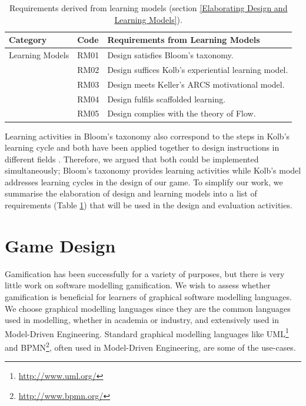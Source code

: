 \documentclass[12pt, a4paper]{report}
\begin{document}
\begin{table}[ht]
\caption{Requirements derived from learning models (section \ref{Elaborating Design and Learning Models}).}
\label{design-learning-models}
\begin{center}
\begin{tabular}{ p{2cm}p{1cm}p{10cm} } 
\hline
Category & Code & Requirements from Learning Models \\
\hline
\multirow{1}{2cm}{Learning Models} 
& RM01 & Design satisfies Bloom's taxonomy. \\
& RM02 & Design suffices Kolb's experiential learning model. \\ 
& RM03 & Design meets Keller's ARCS motivational model. \\
& RM04 & Design fulfils scaffolded learning. \\
& RM05 & Design complies with the theory of Flow. \\ 
\hline
\end{tabular}
\end{center}
\end{table}

Learning activities in Bloom's taxonomy also correspond to the steps in Kolb's learning cycle \cite{murphy2007prior} and both have been applied together to design instructions in different fields \cite{terry1993kolb, howard1996felder, schatzberg2002applying}. Therefore, we argued that both could be implemented simultaneously; Bloom's taxonomy provides learning activities while Kolb's model addresses learning cycles in the design of our game. To simplify our work, we summarise the elaboration of design and learning models into a list of requirements (Table \ref{design-learning-models}) that will be used in the design and evaluation activities.

\section{Game Design}
\label{Game Design}
Gamification has been successfully for a variety of purposes, but there is very little work on software modelling gamification. We wish to assess whether gamification is beneficial for learners of graphical software modelling languages. We choose graphical modelling languages since they are the common languages used in modelling, whether in academia or industry, and extensively used in Model-Driven Engineering. Standard graphical modelling languages like UML\footnote{\url{http://www.uml.org/}} and BPMN\footnote{\url{http://www.bpmn.org/}}, often used in Model-Driven Engineering, are some of the use-cases.        
\end{document}
